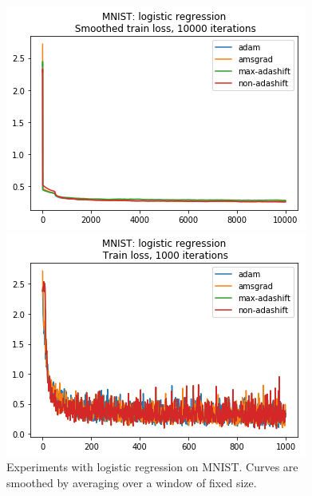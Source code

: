 \documentclass{article} %
\begin{document}
\begin{figure}[t]
\centering
\begin{minipage}{.5\linewidth}
\includegraphics[width=.99\linewidth]{mnist_LR_smooth_1000.png}
\end{minipage}\hfill
\begin{minipage}{.5\linewidth}
\includegraphics[width=.99\linewidth]{mnist_LR_1000.png}
\end{minipage}
\caption{Experiments with logistic regression on MNIST. Curves are smoothed by averaging over a window of fixed size.}\label{fig:mnist:lr}
\end{figure}
\end{document}
